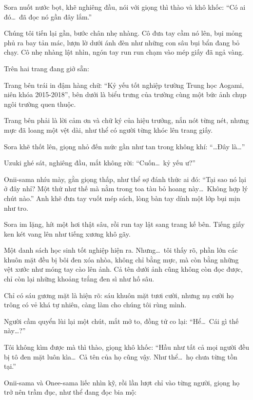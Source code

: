 \documentclass[../main.tex]{subfiles}
\begin{document}
Sora nuốt nước bọt, khẽ nghiêng đầu, nói với giọng thì thào và khô khốc: ``Có ai đó\dots\ đã đọc nó gần đây lắm.''

Chúng tôi tiến lại gần, bước chân nhẹ nhàng. Cô đưa tay cầm nó lên, bụi mỏng phủ ra bay tản mác, lượn lờ dưới ánh đèn như những con sâu bụi bẩn đang bỏ chạy. Cô nhẹ nhàng lật nhìn, ngón tay run run chạm vào mép giấy đã ngả vàng.

Trên hai trang đang giở sẵn:

Trang bên trái in đậm hàng chữ: ``Kỷ yếu tốt nghiệp trường Trung học Aogami, niên khóa 2015-2018'', bên dưới là biểu trưng của trường cùng một bức ảnh chụp ngôi trường quen thuộc.

Trang bên phải là lời cảm ơn và chữ ký của hiệu trưởng, nắn nót từng nét, nhưng mực đã loang một vệt dài, như thể có người từng khóc lên trang giấy.


Sora khẽ thốt lên, giọng nhỏ đến mức gần như tan trong không khí: ``\dots Đây là\dots''

Uzuki ghé sát, nghiêng đầu, mắt không rời: ``Cuốn\dots\ kỷ yếu ư?''

Onii-sama nhíu mày, gằn giọng thấp, như thể sợ đánh thức ai đó: ``Tại sao nó lại ở đây nhỉ? Một thứ như thế mà nằm trong toa tàu bỏ hoang này\dots\ Không hợp lý chút nào.'' Anh khẽ đưa tay vuốt mép sách, lòng bàn tay dính một lớp bụi mịn như tro.

Sora im lặng, hít một hơi thật sâu, rồi run tay lật sang trang kế bên. Tiếng giấy ken két vang lên như tiếng xương khô gãy.

Một danh sách học sinh tốt nghiệp hiện ra. Nhưng\dots\ tôi thấy rõ, phần lớn các khuôn mặt đều bị bôi đen xóa nhòa, không chỉ bằng mực, mà còn bằng những vệt xước như móng tay cào lên ảnh. Cả tên dưới ảnh cũng không còn đọc được, chỉ còn lại những khoảng trắng đen sì như hố sâu.

Chỉ có sáu gương mặt là hiện rõ: sáu khuôn mặt tươi cười, nhưng nụ cười họ trông có vẻ khá tự nhiên, càng làm cho chúng tôi rùng mình.


Người cầm quyển lùi lại một chút, mắt mở to, đồng tử co lại: ``Hể\dots\ Cái gì thế này\dots?''

Tôi không kìm được mà thì thào, giọng khô khốc: ``Hầu như tất cả mọi người đều bị tô đen mặt luôn kìa\dots\ Cả tên của họ cũng vậy. Như thể\dots\ họ chưa từng tồn tại.''

Onii-sama và Onee-sama liếc nhìn kỹ, rồi lần lượt chỉ vào từng người, giọng họ trở nên trầm đục, như thể đang đọc bia mộ:
\end{document}
